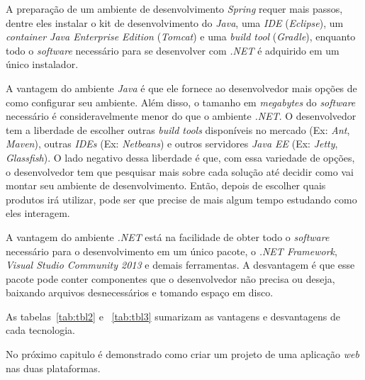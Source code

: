 A preparação de um ambiente de desenvolvimento \textit{Spring} requer mais passos, dentre eles instalar o kit de desenvolvimento do \textit{Java}, uma \textit{IDE} (\textit{Eclipse}), um \textit{container Java Enterprise Edition} (\textit{Tomcat}) e uma \textit{build tool} (\textit{Gradle}), enquanto  todo o \textit{software} necessário para se desenvolver com \textit{.NET} é adquirido em um único instalador.

A vantagem do ambiente \textit{Java} é que ele fornece ao desenvolvedor mais opções de como configurar seu ambiente. Além disso, o tamanho em \textit{megabytes} do \textit{software} necessário é consideravelmente menor do que o ambiente \textit{.NET}. O desenvolvedor tem a liberdade de escolher outras \textit{build tools} disponíveis no mercado (Ex: \textit{Ant}, \textit{Maven}), outras \textit{IDEs} (Ex: \textit{Netbeans}) e outros servidores \textit{Java EE} (Ex: \textit{Jetty}, \textit{Glassfish}). O lado negativo dessa liberdade é que, com  essa variedade de opções, o desenvolvedor tem que pesquisar mais sobre cada solução até decidir como vai montar seu ambiente de desenvolvimento. Então, depois de escolher quais produtos irá utilizar, pode ser que precise de mais algum tempo estudando como eles interagem.

A vantagem do ambiente \textit{.NET} está na facilidade de obter todo o \textit{software} necessário para o desenvolvimento em um único pacote, o \textit{.NET Framework}, \textit{Visual Studio Community 2013} e demais ferramentas. A desvantagem é que esse pacote pode conter componentes que o desenvolvedor não precisa ou deseja, baixando arquivos desnecessários e tomando espaço em disco.

As tabelas~\ref{tab:tbl2} e ~\ref{tab:tbl3} sumarizam as vantagens e desvantagens de cada tecnologia.

\begin{table}[h!]   
    \centering
\end{table}

No próximo capitulo é demonstrado como criar um projeto de uma aplicação \textit{web} nas duas plataformas.